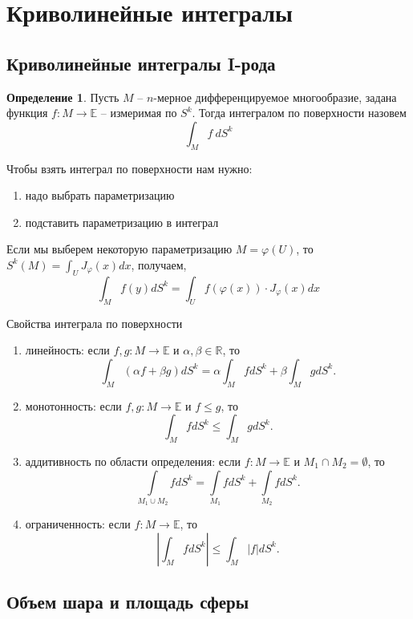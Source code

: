\documentclass[a5paper]{article}
\newcounter{through}
\theoremstyle{plain}
\theoremstyle{definition}
\newtheorem{definition}[through]{Определение}
\numberwithin{through}{section}
\numberwithin{equation}{section}
\begin{document}
\section{Криволинейные интегралы}
\subsection{Криволинейные интегралы I-рода}

\begin{definition}
	Пусть $M$ -- $n$-мерное дифференцируемое многообразие, задана функция
	$f: M \to \mathbb{E}$ -- измеримая по $S^k$. Тогда интегралом по поверхности назовем 
	\[ \int_M f\ dS^k \]
\end{definition}

Чтобы взять интеграл по поверхности нам нужно: 
\begin{enumerate}
	\item 
	надо выбрать параметризацию
	
	\item 
	подставить параметризацию в интеграл
\end{enumerate}

Если мы выберем некоторую параметризацию $M = \varphi(U)$, то $S^k(M) = \int_U J_{\varphi}(x)dx$, получаем,
 \[ \int_M f(y)dS^k = \int_U f(\varphi(x))\cdot J_\varphi (x)dx \]
 
 
 Свойства интеграла по поверхности
 \begin{enumerate}
 	\item 
 	линейность: если $f, g: M \to \mathbb{E}$ и $\alpha, \beta \in \mathbb{R}$, то 
 	\[ \int_M (\alpha f + \beta g) dS^k = \alpha \int_M f dS^k + 
 	\beta\int_M g dS^k. \]
 	
 	\item 
 	монотонность: если $f, g: M \to \mathbb{E}$ и $f \leq g$, то
 	\[ \int_M f dS^k \leq \int_M g dS^k. \]
 	
 	\item
 	аддитивность по области определения: если $f: M \to \mathbb{E}$ 
 	и $M_1 \cap M_2 = \emptyset$, то 
 	\[ \underset{M_1 \cup M_2}{\int} f dS^k = 
 	\underset{M_1}{\int} f dS^k +\underset{M_2}{\int}  f dS^k. \]
 	
 	\item 
 	ограниченность: если $f: M \to \mathbb{E}$, то
 	\[ \left| \int_M f dS^k \right| \leq \int_M |f| dS^k.  \]
 	
 \end{enumerate}

\subsection{Объем шара и площадь сферы} %
\end{document}
